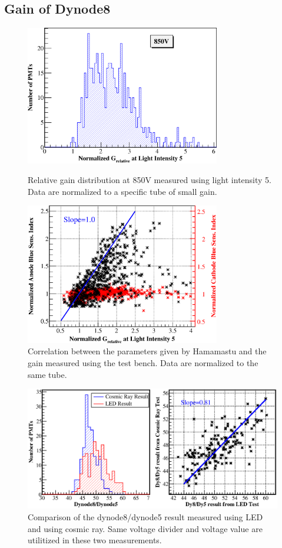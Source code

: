 \documentclass[5p, times]{elsarticle}
\begin{document}
\subsection{Gain of Dynode8}
\label{sec:psd_gain}

\begin{figure}[h!]
 \centering
 \includegraphics[width=85mm]{GainDist}
\caption{Relative gain distribution at 850V measured using light intensity 5.
Data are normalized to a specific tube of small gain.}
\label{fig:gain_dist}

 \centering
 \includegraphics[width=85mm]{correlation_new}
\caption{Correlation between the parameters given by Hamamastu and the gain measured using the test bench.
Data are normalized to the same tube.}
\label{fig:gain_correlation}
\end{figure} 

\begin{figure}
 \centering
 \includegraphics[width=140mm]{dy58_ledvscm}
\caption{Comparison of the dynode8/dynode5 result measured using LED and using cosmic ray.
Same voltage divider and voltage value are utilitized in these two measurements.}
\label{fig:dy58_ledvscm}
\end{figure} 
\end{document}
